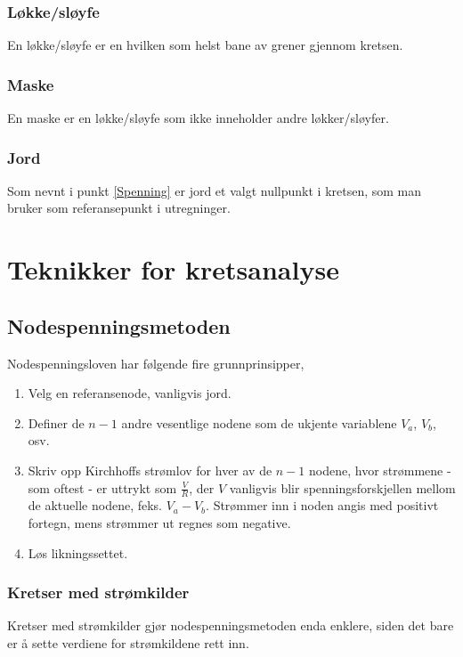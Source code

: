 \documentclass[norsk, a4paper, 12pt, twoside, titlepage]{article}
\begin{document}
\subsubsection{Løkke/sløyfe}
En løkke/sløyfe er en hvilken som helst bane av grener gjennom kretsen.

\subsubsection{Maske}
En maske er en løkke/sløyfe som ikke inneholder andre løkker/sløyfer.

\subsubsection{Jord}
Som nevnt i punkt \ref{Spenning} er jord et valgt nullpunkt i kretsen,
som man bruker som referansepunkt i utregninger.

\newpage
\section{Teknikker for kretsanalyse}

\subsection{Nodespenningsmetoden}
Nodespenningsloven har følgende fire grunnprinsipper,
\begin{enumerate}
\item Velg en referansenode, vanligvis jord.
\item Definer de $n-1$ andre vesentlige nodene som de ukjente
  variablene $V_{a}$, $V_{b}$, osv.
\item Skriv opp Kirchhoffs strømlov for hver av de $n-1$ nodene, hvor
  strømmene - som oftest - er uttrykt som $\frac{V}{R}$, der $V$
  vanligvis blir spenningsforskjellen mellom de aktuelle nodene,
  feks. $V_{a} - V_{b}$.
  Strømmer inn i noden angis med positivt fortegn, mens strømmer ut
  regnes som negative.
\item Løs likningssettet.
\end{enumerate}

\subsubsection{Kretser med strømkilder}
Kretser med strømkilder gjør nodespenningsmetoden enda enklere, siden
det bare er å sette verdiene for strømkildene rett inn.
\end{document}
